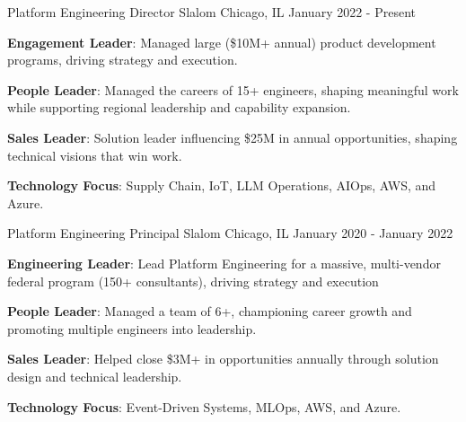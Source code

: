 

\begin{cventries}

  \cventry
    {Platform Engineering Director} %
    {Slalom} %
    {Chicago, IL} %
    {January 2022 - Present} %
    {
      \begin{cvitems} %
        \item {\textbf{Engagement Leader}: Managed large (\$10M+ annual) product development programs, driving strategy and execution.}
        \item {\textbf{People Leader}: Managed the careers of 15+ engineers, shaping meaningful work while supporting regional leadership and capability expansion.}
        \item {\textbf{Sales Leader}: Solution leader influencing \$25M in annual opportunities, shaping technical visions that win work.}
        \item {\textbf{Technology Focus}: Supply Chain, IoT, LLM Operations, AIOps, AWS, and Azure.}
      \end{cvitems}
    }

  \cventry
    {Platform Engineering Principal} %
    {Slalom} %
    {Chicago, IL} %
    {January 2020 - January 2022} %
    {
      \begin{cvitems} %
        \item {\textbf{Engineering Leader}: Lead Platform Engineering for a massive, multi-vendor federal program (150+ consultants), driving strategy and execution}
        \item {\textbf{People Leader}: Managed a team of 6+, championing career growth and promoting multiple engineers into leadership.}
        \item {\textbf{Sales Leader}: Helped close \$3M+ in opportunities annually through solution design and technical leadership.}
        \item {\textbf{Technology Focus}: Event-Driven Systems, MLOps, AWS, and Azure.}
      \end{cvitems}
    }


\end{cventries}
